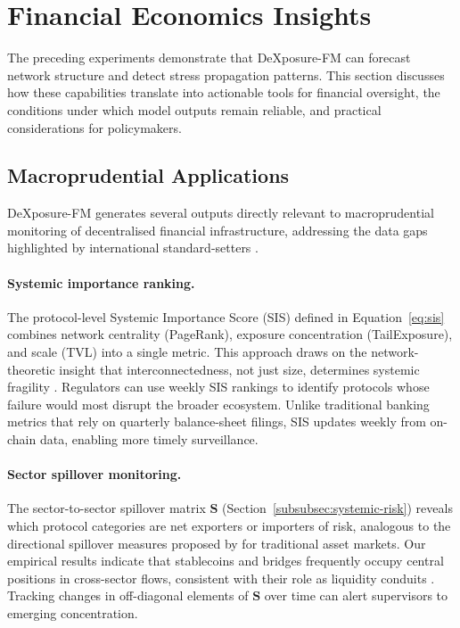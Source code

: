 \section{Financial Economics Insights}
\label{sec:econ}

The preceding experiments demonstrate that DeXposure-FM can forecast network structure and detect stress propagation patterns. This section discusses how these capabilities translate into actionable tools for financial oversight, the conditions under which model outputs remain reliable, and practical considerations for policymakers.

\subsection{Macroprudential Applications}
\label{subsec:macro-applications}

DeXposure-FM generates several outputs directly relevant to macroprudential monitoring of decentralised financial infrastructure, addressing the data gaps highlighted by international standard-setters \citep{FSB2023,IOSCO2023DeFi}.

\paragraph{Systemic importance ranking.}
The protocol-level Systemic Importance Score (SIS) defined in Equation~\eqref{eq:sis} combines network centrality (PageRank), exposure concentration (TailExposure), and scale (TVL) into a single metric. This approach draws on the network-theoretic insight that interconnectedness, not just size, determines systemic fragility \citep{Acemoglu2015SystemicRisk,GlassermanYoung2016Contagion}. Regulators can use weekly SIS rankings to identify protocols whose failure would most disrupt the broader ecosystem. Unlike traditional banking metrics that rely on quarterly balance-sheet filings, SIS updates weekly from on-chain data, enabling more timely surveillance.

\paragraph{Sector spillover monitoring.}
The sector-to-sector spillover matrix $\mathbf{S}$ (Section~\ref{subsubsec:systemic-risk}) reveals which protocol categories are net exporters or importers of risk, analogous to the directional spillover measures proposed by \cite{DieboldYilmaz2012} for traditional asset markets. Our empirical results indicate that stablecoins and bridges frequently occupy central positions in cross-sector flows, consistent with their role as liquidity conduits \citep{KosseEtAl2023Stablecoin,ESRB2025}. Tracking changes in off-diagonal elements of $\mathbf{S}$ over time can alert supervisors to emerging concentration.

